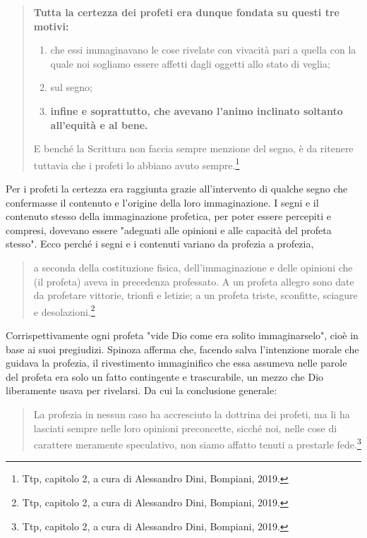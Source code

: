 \begin{quotation}
	\small \textbf{Tutta la certezza dei profeti era dunque fondata su questi tre motivi: }
	\begin{enumerate}
		\item che essi
		immaginavano le cose rivelate con vivacità pari a quella con la quale noi sogliamo essere affetti
		dagli oggetti allo stato di veglia;
		\item sul segno;
		\item \textbf{infine e soprattutto, che avevano l'animo inclinato
		soltanto all'equità e al bene.}
	\end{enumerate}
	
	E benché la Scrittura non faccia sempre menzione del segno, è da
	ritenere tuttavia che i profeti lo abbiano avuto sempre.\footnote{Ttp, capitolo 2, a cura di Alessandro Dini, Bompiani, 2019.}
\end{quotation}

Per i profeti la certezza era raggiunta
 grazie all'intervento di qualche segno che confermasse il contenuto e l'origine della loro
immaginazione. I segni e il contenuto stesso della
immaginazione profetica, per poter essere percepiti e compresi, dovevano essere "adeguati alle
opinioni e alle capacità del profeta stesso". Ecco perché i segni e i contenuti variano da profezia a
profezia, 

\begin{quotation}
	\small a seconda della costituzione fisica, dell'immaginazione e delle opinioni che (il profeta)
	aveva in precedenza professato. A un profeta allegro sono date da profetare vittorie, trionfi e
	letizie; a un profeta triste, sconfitte, sciagure e desolazioni.\footnote{Ttp, capitolo 2, a cura di Alessandro Dini, Bompiani, 2019.}
\end{quotation}

Corrispettivamente ogni profeta "vide Dio come era solito immaginarselo", cioè in base ai suoi
pregiudizi. Spinoza afferma che, facendo salva l'intenzione morale che guidava la profezia, il rivestimento immaginifico che essa assumeva nelle parole del profeta era solo un
fatto contingente e trascurabile, un mezzo che Dio liberamente usava per rivelarsi. Da cui la
conclusione generale: 

\begin{quotation}
	\small La profezia in nessun caso ha accresciuto la dottrina dei profeti, ma li ha
	lasciati sempre nelle loro opinioni preconcette, sicché noi, nelle cose di carattere meramente
	speculativo, non siamo affatto tenuti a prestarle fede.\footnote{Ttp, capitolo 2, a cura di Alessandro Dini, Bompiani, 2019.}
\end{quotation}

